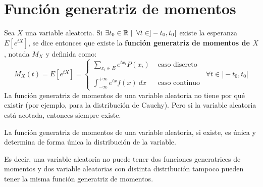 \section{Función generatriz de momentos}

Sea $X$ una variable aleatoria. Si $\exists t_0 \in \mathbb R \mid \; \forall t \in ]-t_0,t_0[$ existe la esperanza
$E[e^{tX}]$,
se dice entonces que existe la \textbf{función generatriz de momentos de $X$}, notada $M_X$ y definida como:
$$M_X(t)=E[e^{tX}] = \left\{ \begin{array}{ll}
    \sum\limits_{x_i \in E} e^{tx_i} P(x_i) & \mbox{ caso discreto} \\ \\
    \displaystyle \int_{-\infty}^{+\infty} e^{tx}f(x)~dx  & \mbox{ caso continuo}
  \end{array} \right.~~\forall t \in ]-t_0, t_0[$$
La función generatriz de momentos de una variable aleatoria no tiene por qué existir (por ejemplo, para la
distribución de Cauchy). Pero si la variable aleatoria está acotada, entonces siempre existe.

\begin{teo}[de unicidad]
    La función generatriz de momentos de una variable aleatoria, si existe, es única y determina de forma única la distribución de la variable.
\end{teo}

Es decir, una variable aleatoria no puede tener dos funciones generatrices de momentos y dos variable aleatorias con distinta distribución tampoco pueden tener la misma función generatriz de momentos.

